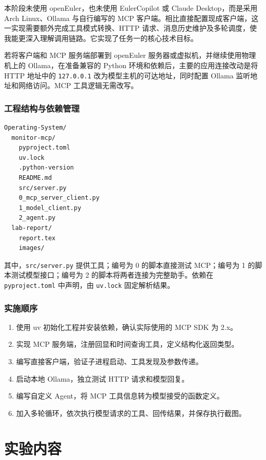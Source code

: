 \documentclass[12pt,a4paper]{ctexart}
\begin{document}
本阶段未使用 openEuler，也未使用 EulerCopilot 或 Claude Desktop，而是采用 Arch Linux、Ollama 与自行编写的 MCP 客户端。相比直接配置现成客户端，这一实现需要额外完成工具模式转换、HTTP 请求、消息历史维护及多轮调度，使我能更深入理解调用链路。它实现了任务一的核心技术目标。

若将客户端和 MCP 服务端部署到 openEuler 服务器或虚拟机，并继续使用物理机上的 Ollama，在准备兼容的 Python 环境和依赖后，主要的应用连接改动是将 HTTP 地址中的 \texttt{127.0.0.1} 改为模型主机的可达地址，同时配置 Ollama 监听地址和网络访问。MCP 工具逻辑无需改写。

\subsubsection{工程结构与依赖管理}

\begin{lstlisting}[language={},basicstyle=\ttfamily\small]
Operating-System/
  monitor-mcp/
    pyproject.toml
    uv.lock
    .python-version
    README.md
    src/server.py
    0_mcp_server_client.py
    1_model_client.py
    2_agent.py
  lab-report/
    report.tex
    images/
\end{lstlisting}
其中，\texttt{src/server.py} 提供工具；编号为 0 的脚本直接测试 MCP；编号为 1 的脚本测试模型接口；编号为 2 的脚本将两者连接为完整助手。依赖在 \texttt{pyproject.toml} 中声明，由 \texttt{uv.lock} 固定解析结果。

\subsubsection{实施顺序}
\begin{enumerate}
  \item 使用 uv 初始化工程并安装依赖，确认实际使用的 MCP SDK 为 2.x。
  \item 实现 MCP 服务端，注册回显和时间查询工具，定义结构化返回类型。
  \item 编写直接客户端，验证子进程启动、工具发现及参数传递。
  \item 启动本地 Ollama，独立测试 HTTP 请求和模型回复。
  \item 编写自定义 Agent，将 MCP 工具信息转为模型接受的函数定义。
  \item 加入多轮循环，依次执行模型请求的工具、回传结果，并保存执行截图。
\end{enumerate}

\section{实验内容}
\end{document}
